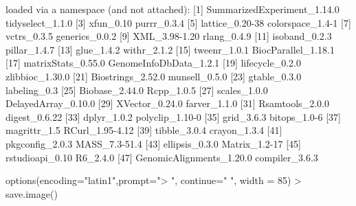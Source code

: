 \documentclass[a4paper,10pt]{article}
\begin{document}
\begin{Schunk}
\begin{Soutput}
loaded via a namespace (and not attached):
 [1] SummarizedExperiment_1.14.0 tidyselect_1.1.0           
 [3] xfun_0.10                   purrr_0.3.4                
 [5] lattice_0.20-38             colorspace_1.4-1           
 [7] vctrs_0.3.5                 generics_0.0.2             
 [9] XML_3.98-1.20               rlang_0.4.9                
[11] isoband_0.2.3               pillar_1.4.7               
[13] glue_1.4.2                  withr_2.1.2                
[15] tweenr_1.0.1                BiocParallel_1.18.1        
[17] matrixStats_0.55.0          GenomeInfoDbData_1.2.1     
[19] lifecycle_0.2.0             zlibbioc_1.30.0            
[21] Biostrings_2.52.0           munsell_0.5.0              
[23] gtable_0.3.0                labeling_0.3               
[25] Biobase_2.44.0              Rcpp_1.0.5                 
[27] scales_1.0.0                DelayedArray_0.10.0        
[29] XVector_0.24.0              farver_1.1.0               
[31] Rsamtools_2.0.0             digest_0.6.22              
[33] dplyr_1.0.2                 polyclip_1.10-0            
[35] grid_3.6.3                  bitops_1.0-6               
[37] magrittr_1.5                RCurl_1.95-4.12            
[39] tibble_3.0.4                crayon_1.3.4               
[41] pkgconfig_2.0.3             MASS_7.3-51.4              
[43] ellipsis_0.3.0              Matrix_1.2-17              
[45] rstudioapi_0.10             R6_2.4.0                   
[47] GenomicAlignments_1.20.0    compiler_3.6.3             
\end{Soutput}
\begin{Sinput}
  options(encoding="latin1",prompt=">  ", continue=" ", width = 85)
>  save.image()
\end{Sinput}
\end{Schunk}
\end{document}
